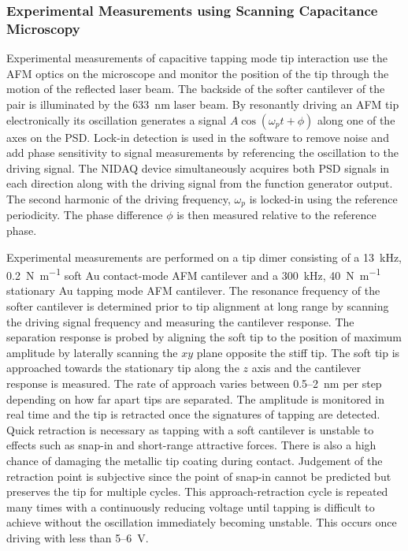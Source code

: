 \documentclass{article}
\begin{document}
\subsubsection{Experimental Measurements using Scanning Capacitance Microscopy}

Experimental measurements of capacitive tapping mode tip interaction use the AFM optics on the microscope and monitor the position of the tip through the motion of the reflected laser beam. The backside of the softer cantilever of the pair is illuminated by the \SI{633}{nm} laser beam. By resonantly driving an AFM tip electronically its oscillation generates a signal $A\cos(\omega_p t + \phi)$ along one of the axes on the PSD. Lock-in detection is used in the software to remove noise and add phase sensitivity to signal measurements by referencing the oscillation to the driving signal. The NIDAQ device simultaneously acquires both PSD signals in each direction along with the driving signal from the function generator output. The second harmonic of the driving frequency, $\omega_p$ is locked-in using the reference periodicity. The phase difference $\phi$ is then measured relative to the reference phase.%

Experimental measurements are performed on a tip dimer consisting of a \SI{13}{kHz}, \SI{0.2}{N.m^{-1}} soft Au contact-mode AFM cantilever and a \SI{300}{kHz}, \SI{40}{N.m^{-1}} stationary Au tapping mode AFM cantilever. The resonance frequency of the softer cantilever is determined prior to tip alignment at long range by scanning the driving signal frequency and measuring the cantilever response. The separation response is probed by aligning the soft tip to the position of maximum amplitude by laterally scanning the $xy$ plane opposite the stiff tip. The soft tip is approached towards the stationary tip along the $z$ axis and the cantilever response is measured. The rate of approach varies between 0.5--\SI{2}{nm} per step depending on how far apart tips are separated. The amplitude is monitored in real time and the tip is retracted once the signatures of tapping are detected. Quick retraction is necessary as tapping with a soft cantilever is unstable to effects such as snap-in and short-range attractive forces. There is also a high chance of damaging the metallic tip coating during contact. Judgement of the retraction point is subjective since the point of snap-in cannot be predicted but preserves the tip for multiple cycles. This approach-retraction cycle is repeated many times with a continuously reducing voltage until tapping is difficult to achieve without the oscillation immediately becoming unstable. This occurs once driving with less than 5--\SI{6}{V}.
\end{document}
